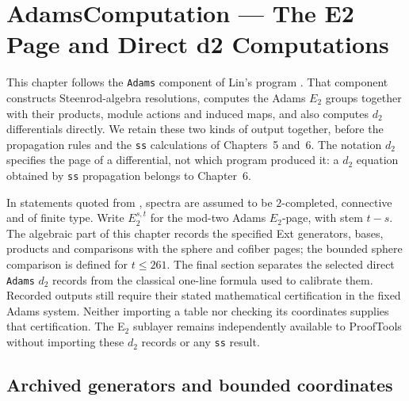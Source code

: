 \chapter{AdamsComputation --- The E2 Page and Direct d2 Computations}
This chapter follows the \texttt{Adams} component of Lin's program
\cite{LinProgram}. That component constructs Steenrod-algebra resolutions,
computes the Adams $E_2$ groups together with their products, module actions
and induced maps, and also computes $d_2$ differentials directly. We retain
these two kinds of output together, before the propagation rules and the
\texttt{ss} calculations of Chapters~5 and~6. The notation $d_2$ specifies
the page of a differential, not which program produced it: a $d_2$ equation
obtained by \texttt{ss} propagation belongs to Chapter~6.

In statements quoted from \cite{LWX126}, spectra are assumed to be
$2$-completed, connective and of finite type. Write $E_2^{s,t}$ for the
mod-two Adams $E_2$-page, with stem $t-s$. The algebraic part of this chapter
records the specified Ext generators, bases, products and comparisons
with the sphere and cofiber pages; the bounded sphere comparison is defined
for $t\leq261$. The final section separates the selected direct
\texttt{Adams} $d_2$ records from the classical one-line formula used to
calibrate them. Recorded outputs still require their stated mathematical
certification in the fixed Adams system. Neither importing a table nor
checking its coordinates supplies that certification. The E$_2$ sublayer
remains independently available to ProofTools without importing these
$d_2$ records or any \texttt{ss} result.

\section{Archived generators and bounded coordinates}


